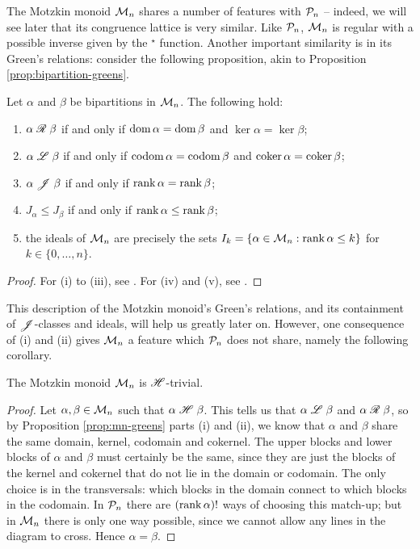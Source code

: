 The Motzkin monoid $\mathcal{M}_n$ shares a number of features with $\mathcal{P}_n$ -- indeed,
we will see later that its congruence lattice is very similar.  Like $\mathcal{P}_n$,
$\mathcal{M}_n$ is regular with a possible inverse given by the $^\star$
function. Another important similarity is in its Green's relations: consider the
following proposition, akin to Proposition \ref{prop:bipartition-greens}.

\begin{proposition}
  \label{prop:mn-greens}
  Let $\alpha$ and $\beta$ be bipartitions in $\mathcal{M}_n$.  The following hold:
  \begin{enumerate}[\rm(i)]
  \item $\alpha \mathrel{\mathscr{R}} \beta$ if and only if $\operatorname{dom} \alpha = \operatorname{dom} \beta$ and
    $\ker \alpha = \ker \beta$;
  \item $\alpha \mathrel{\mathscr{L}} \beta$ if and only if $\operatorname{codom} \alpha = \operatorname{codom} \beta$ and
    $\operatorname{coker} \alpha = \operatorname{coker} \beta$;
  \item $\alpha \mathrel{\mathscr{J}} \beta$ if and only if $\operatorname{rank} \alpha = \operatorname{rank} \beta$;
  \item $J_\alpha \leq J_\beta$ if and only if $\operatorname{rank} \alpha \leq \operatorname{rank} \beta$;
  \item the ideals of $\mathcal{M}_n$ are precisely the sets
    $I_k=\{\alpha \in \mathcal{M}_n : \operatorname{rank} \alpha \leq k\}$ for
    $k \in \{0, \ldots, n\}$.
  \end{enumerate}
  \begin{proof}
    For (i) to (iii), see \cite[Theorem 2.4]{deg_motzkin}.  For (iv) and (v),
    see \cite[Proposition 2.6]{deg_motzkin}.
  \end{proof}
\end{proposition}

This description of the Motzkin monoid's Green's relations, and its containment
of $\mathrel{\mathscr{J}}$-classes and ideals, will help us greatly later on.  However, one
consequence of (i) and (ii) gives $\mathcal{M}_n$ a feature which $\mathcal{P}_n$ does not
share, namely the following corollary.

\begin{corollary}
  \label{cor:mn-h-trivial}
  The Motzkin monoid $\mathcal{M}_n$ is $\mathrel{\mathscr{H}}$-trivial.
  \begin{proof}
    Let $\alpha, \beta \in \mathcal{M}_n$ such that $\alpha \mathrel{\mathscr{H}} \beta$.  This tells us
    that $\alpha \mathrel{\mathscr{L}} \beta$ and $\alpha \mathrel{\mathscr{R}} \beta$, so by Proposition
    \ref{prop:mn-greens} parts (i) and (ii), we know that $\alpha$ and $\beta$
    share the same domain, kernel, codomain and cokernel.  The upper blocks and
    lower blocks of $\alpha$ and $\beta$ must certainly be the same, since they
    are just the blocks of the kernel and cokernel that do not lie in the domain
    or codomain.  The only choice is in the transversals: which blocks in the
    domain connect to which blocks in the codomain.  In $\mathcal{P}_n$ there are
    $(\operatorname{rank} \alpha)!$ ways of choosing this match-up; but in $\mathcal{M}_n$ there is
    only one way possible, since we cannot allow any lines in the diagram to
    cross.  Hence $\alpha = \beta$.
  \end{proof}
\end{corollary}

